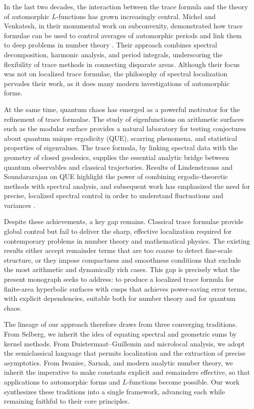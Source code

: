 In the last two decades, the interaction between the trace formula and the
theory of automorphic $L$-functions has grown increasingly central. Michel and
Venkatesh, in their monumental work on subconvexity, demonstrated how trace
formulae can be used to control averages of automorphic periods and link them
to deep problems in number theory \cite{MichelVenkatesh2010}. Their approach
combines spectral decomposition, harmonic analysis, and period integrals,
underscoring the flexibility of trace methods in connecting disparate areas.
Although their focus was not on localized trace formulae, the philosophy of
spectral localization pervades their work, as it does many modern
investigations of automorphic forms.

At the same time, quantum chaos has emerged as a powerful motivator for the
refinement of trace formulae. The study of eigenfunctions on arithmetic
surfaces such as the modular surface provides a natural laboratory for testing
conjectures about quantum unique ergodicity (QUE), scarring phenomena, and
statistical properties of eigenvalues. The trace formula, by linking spectral
data with the geometry of closed geodesics, supplies the essential analytic
bridge between quantum observables and classical trajectories. Results of
Lindenstrauss and Soundararajan on QUE highlight the power of combining
ergodic-theoretic methods with spectral analysis, and subsequent work has
emphasized the need for precise, localized spectral control in order to
understand fluctuations and variances
\cite{LindenstraussQUE,SoundararajanQUE}.

Despite these achievements, a key gap remains. Classical trace formulae provide
global control but fail to deliver the sharp, effective localization required
for contemporary problems in number theory and mathematical physics. The
existing results either accept remainder terms that are too coarse to detect
fine-scale structure, or they impose compactness and smoothness conditions that
exclude the most arithmetic and dynamically rich cases. This gap is precisely
what the present monograph seeks to address: to produce a localized trace
formula for finite-area hyperbolic surfaces with cusps that achieves
power-saving error terms, with explicit dependencies, suitable both for number
theory and for quantum chaos.

The lineage of our approach therefore draws from three converging traditions.
From Selberg, we inherit the idea of equating spectral and geometric sums by
kernel methods. From Duistermaat–Guillemin and microlocal analysis, we adopt
the semiclassical language that permits localization and the extraction of
precise asymptotics. From Iwaniec, Sarnak, and modern analytic number theory,
we inherit the imperative to make constants explicit and remainders effective,
so that applications to automorphic forms and $L$-functions become possible.
Our work synthesizes these traditions into a single framework, advancing each
while remaining faithful to their core principles.

